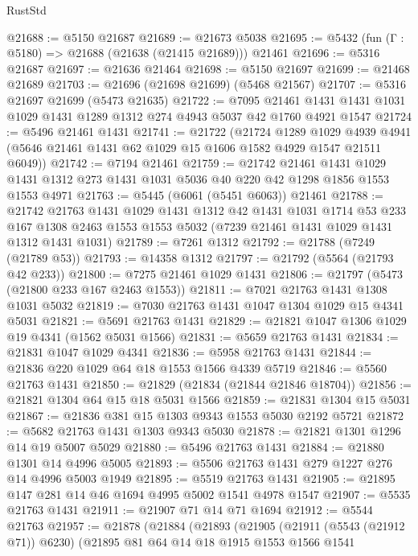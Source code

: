 \begin{lexlean}{RustStd}
\begin{coremodule}
@21688 := @5150 @21687
@21689 := @21673 @5038
@21695 := @5432 (fun (Γ : @5180) => @21688 (@21638 (@21415 @21689))) @21461
@21696 := @5316 @21687
@21697 := @21636 @21464
@21698 := @5150 @21697
@21699 := @21468 @21689
@21703 := @21696 (@21698 @21699) (@5468 @21567)
@21707 := @5316 @21697 @21699 (@5473 @21635)
@21722 := @7095
    @21461
    @1431
    @1431
    @1031
    @1029
    @1431
    @1289
    @1312
    @274
    @4943
    @5037
    @42
    @1760
    @4921
    @1547
@21724 := @5496 @21461 @1431
@21741 := @21722
    (@21724
      @1289
      @1029
      @4939
      @4941
      (@5646 @21461 @1431 @62 @1029 @15 @1606 @1582 @4929 @1547 @21511 @6049))
@21742 := @7194 @21461
@21759 := @21742
    @21461
    @1431
    @1029
    @1431
    @1312
    @273
    @1431
    @1031
    @5036
    @40
    @220
    @42
    @1298
    @1856
    @1553
    @1553
    @4971
@21763 := @5445 (@6061 (@5451 @6063)) @21461
@21788 := @21742
    @21763
    @1431
    @1029
    @1431
    @1312
    @42
    @1431
    @1031
    @1714
    @53
    @233
    @167
    @1308
    @2463
    @1553
    @1553
    @5032
    (@7239 @21461 @1431 @1029 @1431 @1312 @1431 @1031)
@21789 := @7261 @1312
@21792 := @21788 (@7249 (@21789 @53))
@21793 := @14358 @1312
@21797 := @21792 (@5564 (@21793 @42 @233))
@21800 := @7275 @21461 @1029 @1431
@21806 := @21797 (@5473 (@21800 @233 @167 @2463 @1553))
@21811 := @7021 @21763 @1431 @1308 @1031 @5032
@21819 := @7030 @21763 @1431 @1047 @1304 @1029 @15 @4341 @5031
@21821 := @5691 @21763 @1431
@21829 := @21821 @1047 @1306 @1029 @19 @4341 (@1562 @5031 @1566)
@21831 := @5659 @21763 @1431
@21834 := @21831 @1047 @1029 @4341
@21836 := @5958 @21763 @1431
@21844 := @21836 @220 @1029 @64 @18 @1553 @1566 @4339 @5719
@21846 := @5560 @21763 @1431
@21850 := @21829 (@21834 (@21844 @21846 @18704))
@21856 := @21821 @1304 @64 @15 @18 @5031 @1566
@21859 := @21831 @1304 @15 @5031
@21867 := @21836 @381 @15 @1303 @9343 @1553 @5030 @2192 @5721
@21872 := @5682 @21763 @1431 @1303 @9343 @5030
@21878 := @21821 @1301 @1296 @14 @19 @5007 @5029
@21880 := @5496 @21763 @1431
@21884 := @21880 @1301 @14 @4996 @5005
@21893 := @5506 @21763 @1431 @279 @1227 @276 @14 @4996 @5003 @1949
@21895 := @5519 @21763 @1431
@21905 := @21895 @147 @281 @14 @46 @1694 @4995 @5002 @1541 @4978 @1547
@21907 := @5535 @21763 @1431
@21911 := @21907 @71 @14 @71 @1694
@21912 := @5544 @21763
@21957 := @21878
    (@21884
      (@21893
        (@21905
          (@21911 (@5543 (@21912 @71)) @6230)
          (@21895
            @81
            @64
            @14
            @18
            @1915
            @1553
            @1566
            @1541

\end{coremodule}
\end{lexlean}

